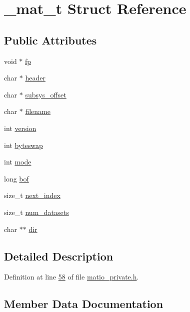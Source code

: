 \hypertarget{struct__mat__t}{}\section{\+\_\+mat\+\_\+t Struct Reference}
\label{struct__mat__t}
\subsection*{Public Attributes}
\begin{DoxyCompactItemize}
\item 
void $\ast$ \hyperlink{struct__mat__t_a85f562e407ca9ad4d2a6e14f839432b7}{fp}
\item 
char $\ast$ \hyperlink{struct__mat__t_a5ed5d0e4e3c4d76b626a8a1772d579c4}{header}
\item 
char $\ast$ \hyperlink{struct__mat__t_a19317c01209959d755d69311960d3eec}{subsys\+\_\+offset}
\item 
char $\ast$ \hyperlink{struct__mat__t_a340b191598135edd03b6dec847f0b1b1}{filename}
\item 
int \hyperlink{struct__mat__t_a729c2bc0afc97485057a5af425635b1a}{version}
\item 
int \hyperlink{struct__mat__t_a99d207977af5e04941ace56d71817a40}{byteswap}
\item 
int \hyperlink{struct__mat__t_aa43288b63b8edb7cadf0b79e2d1df2ee}{mode}
\item 
long \hyperlink{struct__mat__t_a0f87794a6113bd568fe591953e20ddf3}{bof}
\item 
size\+\_\+t \hyperlink{struct__mat__t_a0163a12f9735356723bb604992639d9e}{next\+\_\+index}
\item 
size\+\_\+t \hyperlink{struct__mat__t_af37d0ba323e65edb27ecd5a2f766a3a4}{num\+\_\+datasets}
\item 
char $\ast$$\ast$ \hyperlink{struct__mat__t_a1bc6c604459d0787801d5e53d365684c}{dir}
\end{DoxyCompactItemize}


\subsection{Detailed Description}


Definition at line \hyperlink{matio__private_8h_source_l00058}{58} of file \hyperlink{matio__private_8h_source}{matio\+\_\+private.\+h}.



\subsection{Member Data Documentation}
\mbox{\label{struct__mat__t_a0f87794a6113bd568fe591953e20ddf3}} 
